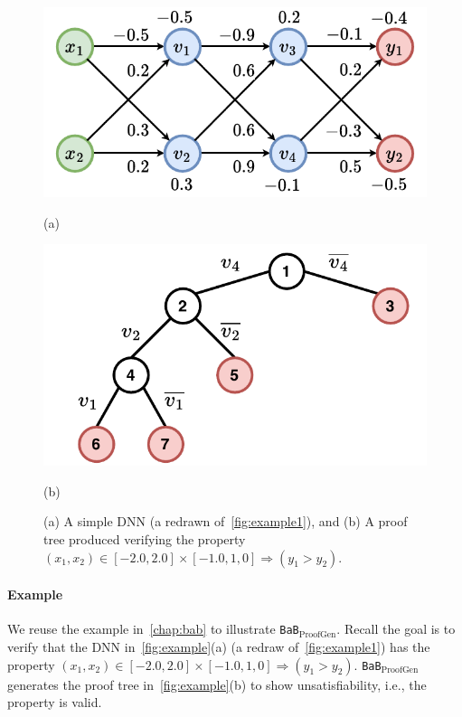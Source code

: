 \documentclass[oneside,11pt,dvipsnames]{book}
\numberwithin{equation}{section}
\theoremstyle{definition}
\theoremstyle{remark}
\newcommand{\proofgen}{\texttt{BaB$_{\text{ProofGen}}$}}
\newcommand{\neuralsat}{\texttt{NeuralSAT}}
\begin{document}
\begin{figure}[t]
    \begin{minipage}[b]{\linewidth}
        \centering
        \begin{minipage}[t]{0.48\textwidth}
            \centering  
            \includegraphics[width=\linewidth]{figure/proof_net.pdf}
            \caption*{(a)}
        \end{minipage}
        \begin{minipage}[t]{0.48\textwidth}
            \centering
            \includegraphics[width=\linewidth]{figure/proof_tree.pdf}
            \caption*{(b)}
        \end{minipage}
        \caption{(a) A simple DNN  (a redrawn of~\autoref{fig:example1}), and (b) A proof tree produced verifying the property $(x_1, x_2) \in [-2.0, 2.0] \times [-1.0, 1,0] \Rightarrow (y_1 > y_2)$.}
        \label{fig:example}
    \end{minipage}
\end{figure}

\paragraph{Example} We reuse the example in~\autoref{chap:bab} to illustrate \proofgen{}. Recall the goal is to verify that the DNN in~\autoref{fig:example}(a) (a redraw of~\autoref{fig:example1}) has the property $(x_1, x_2) \in [-2.0, 2.0] \times [-1.0, 1,0] \Rightarrow (y_1 > y_2)$. \proofgen{} generates the proof tree in~\autoref{fig:example}(b) to show unsatisfiability, i.e., the property is valid.
\end{document}
